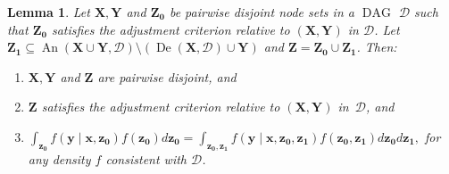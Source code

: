\documentclass[11pt,a4paper]{article}
\newtheorem{lemma}[definition]{Lemma}
\DeclareMathOperator{\DAG}{DAG}
\DeclareMathOperator{\De}{De}
\DeclareMathOperator{\An}{An}
\newcommand{\g}[1][G]{\mathcal{#1}}
\begin{document}
\begin{lemma}
Let $\mathbf{X},\mathbf{Y}$ and $\mathbf{Z_0}$ be pairwise disjoint node sets in a $\DAG$ $\g[D]$ such that $\mathbf{Z_0}$ satisfies the adjustment criterion relative to $(\mathbf{X,Y})$ in $\g[D]$. Let $\mathbf{Z_1} \subseteq \An(\mathbf{X} \cup \mathbf{Y},\g[D]) \setminus ( \De(\mathbf{X}, \g[D]) \cup \mathbf{Y})$ and $\mathbf{Z} = \mathbf{Z_0} \cup \mathbf{Z_1}$.
Then:
\begin{enumerate}[label = (\roman*)]
\item\label{l:zp-satisf-ac1} $\mathbf{X,Y}$ and $\mathbf{Z}$ are pairwise disjoint, and
\item\label{l:zp-satisf-ac2} $\mathbf{Z}$ satisfies the adjustment criterion relative to $(\mathbf{X,Y})$ in~$\g[D]$, and
\item\label{l:zp-satisf-ac3} $\int_\mathbf{z_0} f(\mathbf{y} \mid \mathbf{x,z_0})f(\mathbf{z_0}) d\mathbf{z_0}
= \int_{\mathbf{z_0,z_1}} f(\mathbf{y} \mid \mathbf{x,z_0,z_1}) f(\mathbf{z_0,z_1}) d\mathbf{z_0}d\mathbf{z_1},$ for any density $f$ consistent with $\g[D]$.
\end{enumerate}
\label{lemma:zprime satisfies ac}
\end{lemma}
\end{document}
